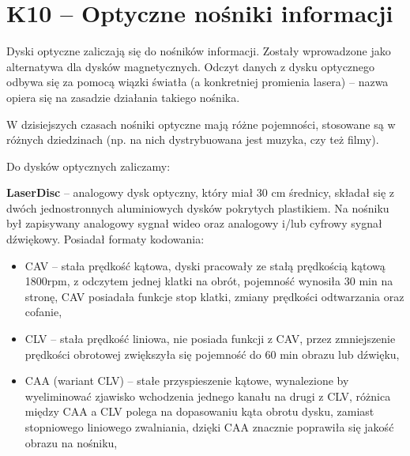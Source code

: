 \section{K10 -- Optyczne nośniki informacji}

Dyski optyczne zaliczają się do nośników informacji. Zostały wprowadzone jako alternatywa dla dysków magnetycznych. Odczyt danych z dysku optycznego odbywa się za pomocą wiązki światła (a konkretniej promienia lasera) -- nazwa opiera się na zasadzie działania takiego nośnika.

W dzisiejszych czasach nośniki optyczne mają różne pojemności, stosowane są w różnych dziedzinach (np. na nich dystrybuowana jest muzyka, czy też filmy). 

Do dysków optycznych zaliczamy:

\textbf{LaserDisc} -- analogowy dysk optyczny, który miał 30 cm średnicy, składał się z dwóch jednostronnych aluminiowych dysków pokrytych plastikiem. Na nośniku był zapisywany analogowy sygnał wideo oraz analogowy i/lub cyfrowy sygnał dźwiękowy. Posiadał formaty kodowania:
\begin{itemize}
	\setlength\itemsep{1pt}
	\item CAV -- stała prędkość kątowa, dyski pracowały ze stałą prędkością kątową 1800rpm, z odczytem jednej klatki na obrót, pojemność wynosiła 30 min na stronę, CAV posiadała funkcje stop klatki, zmiany prędkości odtwarzania oraz cofanie,
	\item CLV -- stała prędkość liniowa, nie posiada funkcji z CAV, przez zmniejszenie prędkości obrotowej zwiększyła się pojemność do 60 min obrazu lub dźwięku,
	\item CAA (wariant CLV) -- stałe przyspieszenie kątowe, wynalezione by wyeliminować zjawisko wchodzenia jednego kanału na drugi z CLV, różnica między CAA a CLV polega na dopasowaniu kąta obrotu dysku, zamiast stopniowego liniowego zwalniania, dzięki CAA znacznie poprawiła się jakość obrazu na nośniku,
\end{itemize}


